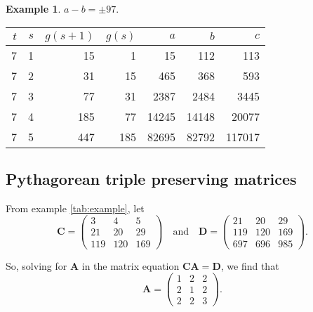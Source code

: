 \documentclass{article}
\theoremstyle{definition}
\newtheorem{example}{Example}[section]
\begin{document}
\begin{example}
\( a - b = \pm 97\).

\smallskip

\begin{minipage}{0.9\textwidth}
\centering
\begin{tabular}{rr|rr|rrr}
\(t\) & \(s\) & \(g(s+1)\) & \(g(s)\) & \(a\) & \(b\) & \(c\) \\ \hline
7 & 1 &15 & 1 &  15 &112 &113 \\
7 & 2 &31 &15 & 465 &368 &593 \\
7 & 3 &77 &31 &2387&2484&3445 \\
7 & 4 &185&77 &14245&14148&20077 \\
7 & 5 &447&185&82695&82792&117017
\end{tabular}
\end{minipage}
\end{example}

\subsection{Pythagorean triple preserving matrices}

From example \ref{tab:example}, let \[\mathbf{C} = \begin{pmatrix} 3 & 4 & 5 \\ 21 & 20 & 29 \\ 119 & 120 & 169 \end{pmatrix} \quad\text{and}\quad \mathbf{D} = \begin{pmatrix} 21 & 20 & 29 \\ 119 & 120 & 169 \\ 697 & 696 & 985 \end{pmatrix}.\]

So, solving for \(\mathbf{A}\) in the matrix equation \(\mathbf{C}\mathbf{A}=\mathbf{D}\), we find that \[\mathbf{A} = \begin{pmatrix}1 & 2 & 2 \\ 2 & 1 & 2 \\ 2 & 2 & 3 \end{pmatrix}.\]
\end{document}
